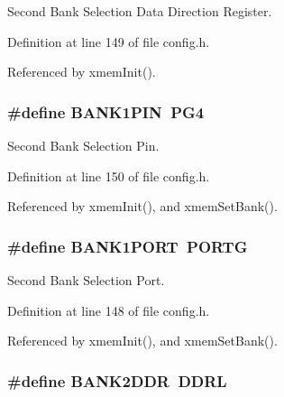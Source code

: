 Second Bank Selection Data Direction Register. 



Definition at line 149 of file config.\-h.



Referenced by xmem\-Init().

\hypertarget{group__config_gacfebedc2067e3c52e6ae1f627afcc1e1}{
\subsubsection[{B\-A\-N\-K1\-P\-I\-N}]{\setlength{\rightskip}{0pt plus 5cm}\#define B\-A\-N\-K1\-P\-I\-N~P\-G4}}\label{group__config_gacfebedc2067e3c52e6ae1f627afcc1e1}


Second Bank Selection Pin. 



Definition at line 150 of file config.\-h.



Referenced by xmem\-Init(), and xmem\-Set\-Bank().

\hypertarget{group__config_ga8b3ee7126196f6e939989eae097c3ac4}{
\subsubsection[{B\-A\-N\-K1\-P\-O\-R\-T}]{\setlength{\rightskip}{0pt plus 5cm}\#define B\-A\-N\-K1\-P\-O\-R\-T~P\-O\-R\-T\-G}}\label{group__config_ga8b3ee7126196f6e939989eae097c3ac4}


Second Bank Selection Port. 



Definition at line 148 of file config.\-h.



Referenced by xmem\-Init(), and xmem\-Set\-Bank().

\hypertarget{group__config_ga62f56230c5f5f7220c44ab1c93d677ab}{
\subsubsection[{B\-A\-N\-K2\-D\-D\-R}]{\setlength{\rightskip}{0pt plus 5cm}\#define B\-A\-N\-K2\-D\-D\-R~D\-D\-R\-L}}\label{group__config_ga62f56230c5f5f7220c44ab1c93d677ab}


